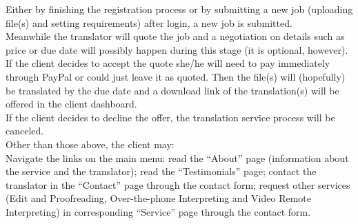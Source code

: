 \documentclass{l3proj}
\begin{document}
Either by finishing the registration process or by submitting a new job (uploading file(s) and setting requirements) after login, a new job is submitted.\\

Meanwhile the translator will quote the job and a negotiation on details such as price or due date will possibly happen during this stage (it is optional, however).\\

If the client decides to accept the quote she/he will need to pay immediately through PayPal or could just leave it as quoted. Then the file(s) will (hopefully) be translated by the due date and a download link of the translation(s) will be offered in the client dashboard.\\

If the client decides to decline the offer, the translation service process will be canceled.\\

Other than those above, the client may: \\

	Navigate the links on the main menu: read the “About” page (information about the service and the translator); read the “Testimonials” page; contact the translator in the “Contact” page through the contact form; request other services (Edit and Proofreading, Over-the-phone Interpreting and Video Remote Interpreting) in corresponding “Service” page through the contact form. \\


\newpage
\end{document}
